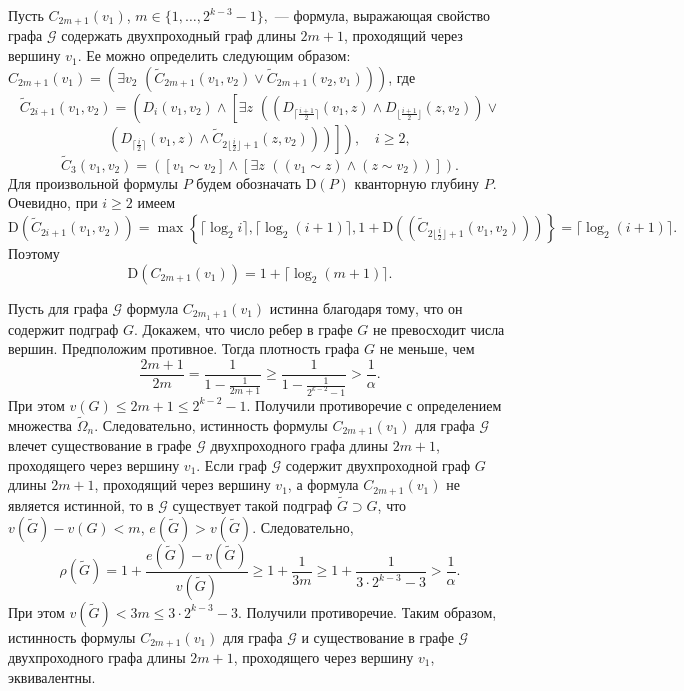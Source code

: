 \documentclass[12pt,a4paper,russian,titlepage]{article}
\begin{document}
Пусть $C_{2m+1}(v_1)$, $m\in \{1,\ldots,2^{k-3}-1\},$ --- формула, выражающая свойство графа $\mathcal{G}$ содержать двухпроходный граф длины $2m + 1$, проходящий через вершину $v_1$. Ее можно определить следующим образом: $C_{2m+1}(v_1)=(\exists v_2\,\,(\tilde C_{2m+1}(v_1,v_2)\vee \tilde C_{2m+1}(v_2,v_1)))$, где
$$
 \tilde C_{2i+1}(v_1,v_2)=
 \left(D_i(v_1,v_2)\wedge
 \left[\exists z\,\,\left(\left(D_{\lceil\frac{i+1}{2}\rceil}(v_1,z)\wedge D_{\lfloor\frac{i+1}{2}\rfloor}(z,v_2)\right)\vee\right.\right.\right.
$$
$$
 \left.\left.\left.\left(D_{\lceil\frac{i}{2}\rceil}(v_1,z)\wedge \tilde C_{2\lfloor\frac{i}{2}\rfloor+1}(z,v_2)\right)\right)\right]\right),\quad i\geq 2,
$$
$$
 \tilde C_3(v_1,v_2)=([v_1\sim v_2]\wedge[\exists z \,\,((v_1\sim z)\wedge(z\sim v_2))]).
$$
Для произвольной формулы $P$ будем обозначать $\mathrm{D}(P)$ кванторную глубину $P$. Очевидно, при $i\geq 2$ имеем
$$
 \mathrm{D}(\tilde C_{2i+1}(v_1,v_2))=\max\left\{\lceil\log_2 i\rceil,\lceil\log_2(i+1)\rceil,1+\mathrm{D}((\tilde  C_{2\lfloor\frac{i}{2}\rfloor+1}(v_1,v_2)))\right\}=
 \lceil\log_2(i+1)\rceil.
$$
Поэтому
\begin{equation}
\mathrm{D}(C_{2m+1}(v_1))=1+\lceil\log_2(m+1)\rceil.
\label{depth}
\end{equation}


Пусть для графа $\mathcal{G}$ формула $C_{2m_1+1}(v_1)$ истинна благодаря тому, что он содержит подграф $G$. Докажем, что число ребер в графе $G$ не превосходит числа вершин. Предположим противное. Тогда плотность графа $G$ не меньше, чем 
$$
 \frac{2m+1}{2m}=\frac{1}{1-\frac{1}{2m+1}}\geq\frac{1}{1-\frac{1}{2^{k-2}-1}}>\frac{1}{\alpha}.
$$
При этом $v(G)\leq 2m+1\leq 2^{k-2}-1$. Получили противоречие с определением множества $\tilde\Omega_n$. Следовательно, истинность формулы $C_{2m+1}(v_1)$ для графа $\mathcal{G}$ влечет существование в графе $\mathcal{G}$ двухпроходного графа длины $2m+1$, проходящего через вершину $v_1$. Если граф $\mathcal{G}$ содержит двухпроходной граф $G$ длины $2m+1$, проходящий через вершину $v_1$, а формула $C_{2m+1}(v_1)$ не является истинной, то в $\mathcal{G}$ существует такой подграф $\tilde G\supset G$, что $v(\tilde G)-v(G)<m$, $e(\tilde G)>v(\tilde G)$. Следовательно,
$$
 \rho(\tilde G) = 1 + \frac{e(\tilde G)-v(\tilde G)}{v(\tilde G)} \geq 1 + \frac{1}{3m}\geq 1 + \frac{1}{3\cdot 2^{k - 3} - 3} > \frac{1}{\alpha}.
$$
При этом $v(\tilde G)<3m\leq 3\cdot 2^{k-3}-3$. Получили противоречие. Таким образом, истинность формулы $C_{2m+1}(v_1)$ для графа $\mathcal{G}$ и существование в графе $\mathcal{G}$ двухпроходного графа длины $2m+1$, проходящего через вершину $v_1$, эквивалентны.
\end{document}

